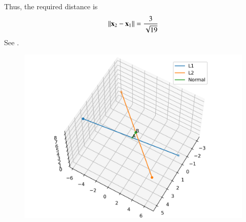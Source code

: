     Thus, the required distance is
    \begin{align}
        \left\lVert\mathbf{x}_2-\mathbf{x}_1\right\rVert = \frac{3}{\sqrt{19}}
    \end{align}
See .
    \begin{figure}[!ht]
        \centering
        \includegraphics[width=\columnwidth]{chapters/12/11/2/16/lsq/figs/skew.png}
        \caption{}
        \label{fig:chapters/12/11/2/16/skew}
    \end{figure}

